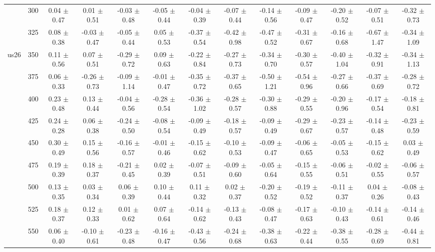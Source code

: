 \begin{table}[h]
{\begin{tabular}{
        ccccccccccccc}
 & 300& 0.04 $\pm$ 0.47& 0.01 $\pm$ 0.51& -0.03 $\pm$ 0.48& -0.05 $\pm$ 0.44& -0.04 $\pm$ 0.39& -0.07 $\pm$ 0.44& -0.14 $\pm$ 0.56& -0.09 $\pm$ 0.47& -0.20 $\pm$ 0.52& -0.07 $\pm$ 0.51& -0.32 $\pm$ 0.73 \\ 
 & 325& 0.08 $\pm$ 0.38& -0.03 $\pm$ 0.47& -0.05 $\pm$ 0.44& 0.05 $\pm$ 0.53& -0.37 $\pm$ 0.54& -0.42 $\pm$ 0.98& -0.47 $\pm$ 0.52& -0.31 $\pm$ 0.67& -0.16 $\pm$ 0.68& -0.67 $\pm$ 1.47& -0.34 $\pm$ 1.09 \\ 
\multirow{4}{*}{us26}& 350& 0.11 $\pm$ 0.56& 0.07 $\pm$ 0.51& -0.29 $\pm$ 0.72& 0.09 $\pm$ 0.63& -0.22 $\pm$ 0.84& -0.27 $\pm$ 0.73& -0.34 $\pm$ 0.70& -0.30 $\pm$ 0.57& -0.40 $\pm$ 1.04& -0.32 $\pm$ 0.91& -0.34 $\pm$ 1.13 \\ 
 & 375& 0.06 $\pm$ 0.33& -0.26 $\pm$ 0.73& -0.09 $\pm$ 1.14& -0.01 $\pm$ 0.47& -0.35 $\pm$ 0.72& -0.37 $\pm$ 0.65& -0.50 $\pm$ 1.21& -0.54 $\pm$ 0.96& -0.27 $\pm$ 0.66& -0.37 $\pm$ 0.69& -0.28 $\pm$ 0.72 \\ 
 & 400& 0.23 $\pm$ 0.48& 0.13 $\pm$ 0.44& -0.04 $\pm$ 0.56& -0.28 $\pm$ 0.54& -0.36 $\pm$ 1.02& -0.28 $\pm$ 0.57& -0.30 $\pm$ 0.88& -0.29 $\pm$ 0.55& -0.20 $\pm$ 0.96& -0.17 $\pm$ 0.54& -0.18 $\pm$ 0.81 \\ 
 & 425& 0.24 $\pm$ 0.28& 0.06 $\pm$ 0.38& -0.24 $\pm$ 0.50& -0.08 $\pm$ 0.54& -0.09 $\pm$ 0.49& -0.18 $\pm$ 0.57& -0.09 $\pm$ 0.49& -0.29 $\pm$ 0.67& -0.23 $\pm$ 0.57& -0.14 $\pm$ 0.48& -0.23 $\pm$ 0.59 \\ 
 & 450& 0.30 $\pm$ 0.49& 0.15 $\pm$ 0.56& -0.16 $\pm$ 0.57& -0.01 $\pm$ 0.46& -0.15 $\pm$ 0.62& -0.10 $\pm$ 0.53& -0.09 $\pm$ 0.47& -0.06 $\pm$ 0.65& -0.05 $\pm$ 0.53& -0.15 $\pm$ 0.62& 0.03 $\pm$ 0.49 \\ 
 & 475& 0.19 $\pm$ 0.39& 0.18 $\pm$ 0.37& -0.21 $\pm$ 0.45& 0.02 $\pm$ 0.39& -0.07 $\pm$ 0.51& -0.09 $\pm$ 0.60& -0.05 $\pm$ 0.64& -0.15 $\pm$ 0.55& -0.06 $\pm$ 0.51& -0.02 $\pm$ 0.55& -0.06 $\pm$ 0.57 \\ 
 & 500& 0.13 $\pm$ 0.35& 0.03 $\pm$ 0.34& 0.06 $\pm$ 0.39& 0.10 $\pm$ 0.44& 0.11 $\pm$ 0.32& 0.02 $\pm$ 0.37& -0.20 $\pm$ 0.52& -0.19 $\pm$ 0.52& -0.11 $\pm$ 0.37& 0.04 $\pm$ 0.26& -0.08 $\pm$ 0.43 \\ 
 & 525& 0.18 $\pm$ 0.37& 0.12 $\pm$ 0.33& 0.01 $\pm$ 0.62& 0.07 $\pm$ 0.64& -0.14 $\pm$ 0.62& -0.13 $\pm$ 0.43& -0.08 $\pm$ 0.47& -0.17 $\pm$ 0.63& -0.10 $\pm$ 0.43& -0.14 $\pm$ 0.61& -0.14 $\pm$ 0.46 \\ 
 & 550& 0.06 $\pm$ 0.40& -0.10 $\pm$ 0.61& -0.23 $\pm$ 0.48& -0.16 $\pm$ 0.47& -0.43 $\pm$ 0.56& -0.24 $\pm$ 0.68& -0.38 $\pm$ 0.63& -0.22 $\pm$ 0.44& -0.38 $\pm$ 0.55& -0.28 $\pm$ 0.69& -0.44 $\pm$ 0.81 \\ 

\end{tabular}}
\end{table}
